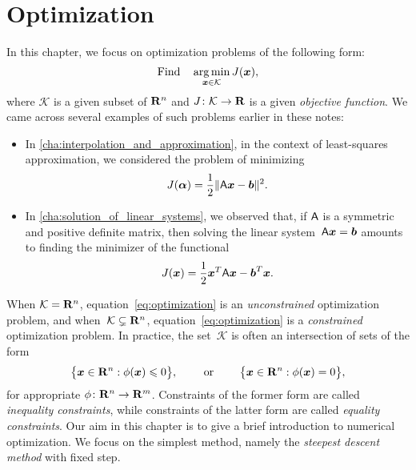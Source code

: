 \chapter{Optimization}%
\label{cha:Optimization}

\minitoc

In this chapter, we focus on optimization problems of the following form:
\begin{equation}
    \label{eq:optimization}
    \text{Find} \quad \operatorname*{arg\,min}_{\mathbf{\boldsymbol{x}} \in \mathcal K} J(\mathbf{\boldsymbol{x}}),
\end{equation}
where $\mathcal K$ is a given subset of $\mathbf R^n$ and $J\colon \mathcal K \to \mathbf R$ is a given \emph{objective function}.
We came across several examples of such problems earlier in these notes:
\begin{itemize}
    \item
        In \cref{cha:interpolation_and_approximation},
        in the context of least-squares approximation,
        we considered the problem of minimizing
        \[
            J(\mathbf{\boldsymbol{\alpha}}) = \frac{1}{2} \lVert \mathsf A \mathbf{\boldsymbol{x}} - \mathbf{\boldsymbol{b}} \rVert^2.
        \]

    \item
        In \cref{cha:solution_of_linear_systems},
        we observed that,
        if $\mathsf A$ is a symmetric and positive definite matrix,
        then solving the linear system~$\mathsf A \mathbf{\boldsymbol{x}} = \mathbf{\boldsymbol{b}}$
        amounts to finding the minimizer of the functional
        \[
            J(\mathbf{\boldsymbol{x}})  = \frac{1}{2} \mathbf{\boldsymbol{x}}^T \mathsf A \mathbf{\boldsymbol{x}} - \mathbf{\boldsymbol{b}}^T \mathbf{\boldsymbol{x}}.
        \]
\end{itemize}
When $\mathcal K = \mathbf R^n$,
equation~\eqref{eq:optimization} is an \emph{unconstrained} optimization problem,
and when~$\mathcal K \subsetneq \mathbf R^n$,
equation~\eqref{eq:optimization} is a \emph{constrained} optimization problem.
In practice,
the set~$\mathcal K$ is often an intersection of sets of the form
\[
    \bigl\{ \mathbf{\boldsymbol{x}} \in \mathbf R^n : \phi(\mathbf{\boldsymbol{x}}) \leqslant 0 \bigr\},
    \qquad
    \text{ or }
    \qquad
    \bigl\{ \mathbf{\boldsymbol{x}} \in \mathbf R^n : \phi(\mathbf{\boldsymbol{x}}) = 0 \bigr\},
\]
for appropriate $\phi\colon \mathbf R^n \to \mathbf R^m$.
Constraints of the former form are called \emph{inequality constraints},
while constraints of the latter form are called \emph{equality constraints}.
Our aim in this chapter is to give a brief introduction to numerical optimization.
We focus on the simplest method,
namely the \emph{steepest descent method} with fixed step.
